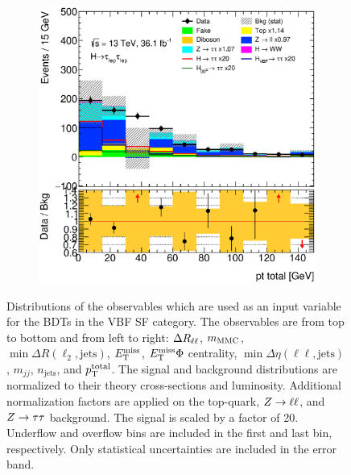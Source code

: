 \begin{figure}[htb]
\begin{subfigure}[t]{0.3\textwidth}
    \end{subfigure}
    \begin{subfigure}[t]{0.3\textwidth}
        \includegraphics[width=\textwidth]{./plots/mva/modeling/input_vars/VBF_SF/ll-CutMVAVBFCatSF-PtTotal-lin.eps}
    \end{subfigure}
    \caption{Distributions of the observables which are used as an input variable for the BDTs in the VBF SF category.
             The observables are from top to bottom and from left to right: $\Delta R_{\ell\ell}$, $m_\text{MMC}$, $\min \Delta R (\ell_2, \text{jets})$,
             $E_\text{T}^\text{miss}$, $E_\text{T}^\text{miss} \Phi$ centrality, $\min \Delta \eta (\ell\ell, \text{jets})$, $m_{jj}$, $n_\text{jets}$, and $p_\text{T}^\text{total}$.
             The signal and background distributions are normalized to their theory cross-sections and luminosity.
             Additional normalization factors are applied on the top-quark, $Z \to \ell \ell$, and $Z \to \tau \tau$ background.
             The signal is scaled by a factor of 20.
             Underflow and overflow bins are included in the first and last bin, respectively.
             Only statistical uncertainties are included in the error band.}\label{fig:mva:modeling:sr:vbfsf}
\end{figure}

